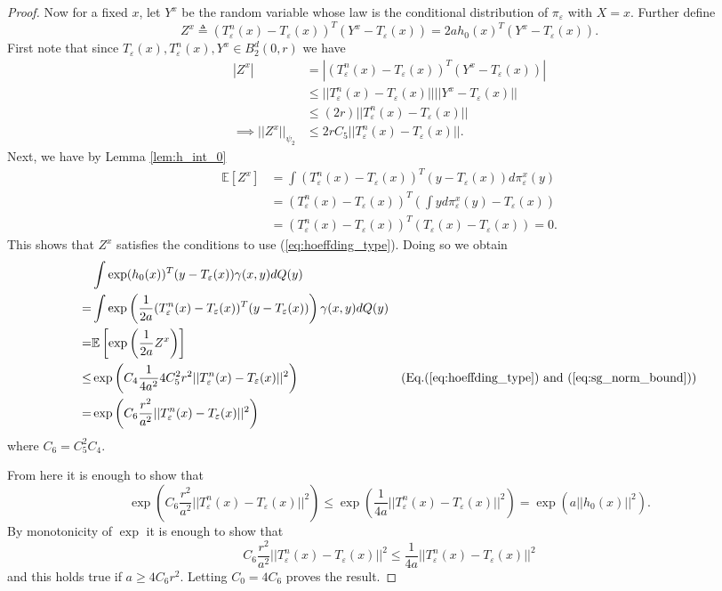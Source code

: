 \documentclass{article}
\theoremstyle{definition}
\newcommand{\Teps}{T_\varepsilon}
\begin{document}
\begin{proof}
    Now for a fixed $x$, let $Y^x$ be the random variable whose law is the conditional distribution of $\pi_\varepsilon$ with $X = x$. Further define
    \begin{equation*}
        Z^x \triangleq (\Teps^n(x) - \Teps(x))^T(Y^x - \Teps(x)) = 2ah_0(x)^T(Y^x - \Teps(x)).
    \end{equation*}
    First note that since $\Teps(x),\Teps^n(x),Y^x \in B_2^d(0,r)$ we have
    \begin{align}
        |Z^x| &= |(\Teps^n(x) - \Teps(x))^T(Y^x - \Teps(x))| \nonumber \\
        &\leq ||\Teps^n(x) - \Teps(x)||||Y^x - \Teps(x)|| \nonumber \\
        &\leq (2r)||\Teps^n(x) - \Teps(x)||  \nonumber \\
        \implies ||Z^x||_{\psi_2} &\leq 2rC_5||\Teps^n(x) - \Teps(x)||. \label{eq:sg_norm_bound}
    \end{align}
    Next, we have by Lemma \ref{lem:h_int_0} 
    \begin{align*}
        \mathbb{E}[Z^x] &= \int (\Teps^n(x) - \Teps(x))^T(y - \Teps(x)) d\pi_\varepsilon^x(y) \\
        &= (\Teps^n(x) - \Teps(x))^T\left (\int yd\pi_\varepsilon^x(y) - \Teps(x)\right ) \\
        &= (\Teps^n(x) - \Teps(x))^T\left (\Teps(x) - \Teps(x)\right ) = 0.
    \end{align*}
    This shows that $Z^x$ satisfies the conditions to use (\ref{eq:hoeffding_type}). Doing so we obtain
    \begin{align*}
        &\int \exp  (h_0(x))^T(y - \Teps(x)) \gamma(x,y) dQ(y) \\
        = &\int \exp \left (\frac{1}{2a} (\Teps^n(x) - \Teps(x))^T(y - \Teps(x))  \right ) \gamma(x,y) dQ(y) \nonumber \\
        = &\mathbb{E}\left[\exp \left (\frac{1}{2a} Z^x \right ) \right ] \nonumber \\
        \leq &\exp \left ( C_4 \frac{1}{4a^2} 4C_5^2r^2||\Teps^n(x) - \Teps(x)||^2 \right ) & (\text{Eq.} (\ref{eq:hoeffding_type}) \text{ and } (\ref{eq:sg_norm_bound})) \\
        = &\exp \left ( C_6 \frac{r^2}{a^2} ||\Teps^n(x) - \Teps(x)||^2 \right ) 
    \end{align*}
    where $C_6 = C_5^2C_4$.
    
    From here it is enough to show that
    \begin{equation*}
        \exp \left ( C_6 \frac{r^2}{a^2} ||\Teps^n(x) - \Teps(x)||^2 \right ) \leq  \exp \left (\frac{1}{4a}||\Teps^n(x) - \Teps(x)||^2 \right ) = \exp(a||h_0(x)||^2).
    \end{equation*}
    By monotonicity of $\exp$ it is enough to show that 
    \begin{equation*}
        C_6 \frac{r^2}{a^2} ||\Teps^n(x) - \Teps(x)||^2 \leq \frac{1}{4a}||\Teps^n(x) - \Teps(x)||^2
    \end{equation*}
    and this holds true if $a \geq 4C_6r^2$. Letting $C_0 = 4C_6$ proves the result.
\end{proof}
\end{document}
